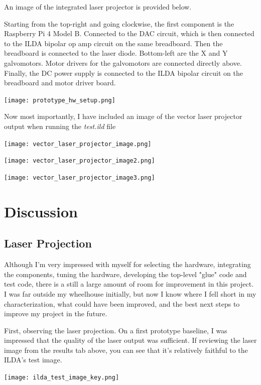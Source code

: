 \documentclass[journal]{IEEEtran}
\begin{document}
    An image of the integrated laser projector is provided below.

    Starting from the top-right and going clockwise, the first component is the Raspberry Pi 4 Model B.
    Connected to the DAC circuit, which is then connected to the ILDA bipolar op amp circuit on the same breadboard.
    Then the breadboard is connected to the laser diode.
    Bottom-left are the X and Y galvomotors.
    Motor drivers for the galvomotors are connected directly above. 
    Finally, the DC power supply is connected to the ILDA bipolar circuit on the breadboard and motor driver board.

    \texttt{[image: prototype\_hw\_setup.png]}

    Now most importantly, I have included an image of the vector laser projector output when running the \emph{test.ild} file

    \texttt{[image: vector\_laser\_projector\_image.png]}

    \texttt{[image: vector\_laser\_projector\_image2.png]}

    \texttt{[image: vector\_laser\_projector\_image3.png]}

    \section{Discussion}
    \subsection{Laser Projection}
    
    Although I'm very impressed with myself for selecting the hardware, integrating the components, tuning the hardware, developing the top-level "glue" code and test code, there is a still a large amount of room for improvement in this project.
    I was far outside my wheelhouse initially, but now I know where I fell short in my characterization, what could have been improved, and the best next steps to improve my project in the future.

    First, observing the laser projection.
    On a first prototype baseline, I was impressed that the quality of the laser output was sufficient.
    If reviewing the laser image from the results tab above, you can see that it's relatively faithful to the ILDA's test image.

    \texttt{[image: ilda\_test\_image\_key.png]}
\end{document}
